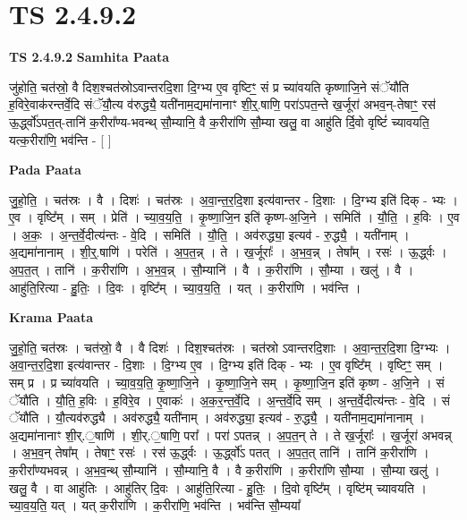 \documentclass[17pt]{extarticle}
\begin{document}
\section{ TS 2.4.9.2 }

\textbf{TS 2.4.9.2 } \newline
\textbf{Samhita Paata} \newline

जु॑होति॒ चत॑स्रो॒ वै दिश॒श्चत॑स्रोऽवान्तरदि॒शा दि॒ग्भ्य ए॒व वृष्टिꣳ॒॒ सं प्र च्या॑वयति कृष्णाजि॒ने संॅयौ॑ति ह॒विरे॒वाक॑रन्तर्वे॒दि संॅयौ॒त्य व॑रुद्ध्यै॒ यती॑नाम॒द्यमा॑नानाꣳ शी॒र्॒.षाणि॒ परा॑ऽपत॒न्ते ख॒र्जूरा॑ अभव॒न्-तेषाꣳ॒॒ रस॑ ऊ॒र्द्ध्वो॑ऽपत॒त्-तानि॑ क॒रीरा᳚ण्य-भवन्थ् सौ॒म्यानि॒ वै क॒रीरा॑णि सौ॒म्या खलु॒ वा आहु॑ति र्दि॒वो वृष्टिं॑ च्यावयति॒ यत्क॒रीरा॑णि॒ भव॑न्ति - [  ] \newline

\textbf{Pada Paata} \newline

जु॒हो॒ति॒ । चत॑स्रः । वै । दिशः॑ । चत॑स्रः । अ॒वा॒न्त॒र॒दि॒शा इत्य॑वान्तर - दि॒शाः । दि॒ग्भ्य इति॑ दिक् - भ्यः । ए॒व । वृष्टि᳚म् । सम् । प्रेति॑ । च्या॒व॒य॒ति॒ । कृ॒ष्णा॒जि॒न इति॑ कृष्ण-अ॒जि॒ने । समिति॑ । यौ॒ति॒ । ह॒विः । ए॒व । अ॒कः॒ । अ॒न्त॒र्वे॒दीत्य॑न्तः - वे॒दि । समिति॑ । यौ॒ति॒ । अव॑रुद्ध्या॒ इत्यव॑ - रु॒द्ध्यै॒ । यती॑नाम् । अ॒द्यमा॑नानाम् । शी॒र्॒.षाणि॑ । परेति॑ । अ॒प॒त॒न्न् । ते । ख॒र्जूराः᳚ । अ॒भ॒व॒न्न् । तेषा᳚म् । रसः॑ । ऊ॒र्द्ध्वः । अ॒प॒त॒त् । तानि॑ । क॒रीरा॑णि । अ॒भ॒व॒न्न् ।  सौ॒म्यानि॑ । वै । क॒रीरा॑णि । सौ॒म्या । खलु॑ । वै । आहु॑ति॒रित्या - हु॒तिः॒ । दि॒वः । वृष्टि᳚म् । च्या॒व॒य॒ति॒ । यत् । क॒रीरा॑णि । भव॑न्ति ।  \newline


\textbf{Krama Paata} \newline

जु॒हो॒ति॒ चत॑स्रः । चत॑स्रो॒ वै । वै दिशः॑ । दिश॒श्चत॑स्रः । चत॑स्रो ऽवान्तरदि॒शाः । अ॒वा॒न्त॒र॒दि॒शा दि॒ग्भ्यः । अ॒वा॒न्त॒र॒दि॒शा इत्य॑वान्तर - दि॒शाः । दि॒ग्भ्य ए॒व । दि॒ग्भ्य इति॑ दिक् - भ्यः । ए॒व वृष्टि᳚म् । वृष्टिꣳ॒॒ सम् । सम् प्र । प्र च्या॑वयति । च्या॒व॒य॒ति॒ कृ॒ष्णा॒जि॒ने । कृ॒ष्णा॒जि॒ने सम् । कृ॒ष्णा॒जि॒न इति॑ कृष्ण - अ॒जि॒ने । सं ॅयौ॑ति । यौ॒ति॒ ह॒विः । ह॒विरे॒व । ए॒वाकः॑ । अ॒क॒र॒न्त॒र्वे॒दि । अ॒न्त॒र्वे॒दि सम् । अ॒न्त॒र्वे॒दीत्य॑न्तः - वे॒दि । सं ॅयौ॑ति । यौ॒त्यव॑रुद्ध्यै । अव॑रुद्ध्यै॒ यती॑नाम् । अव॑रुद्ध्या॒ इत्यव॑ - रु॒द्ध्यै॒ । यती॑नाम॒द्यमा॑नानाम् । अ॒द्यमा॑नानाꣳ शी॒र्.॒षाणि॑ । शी॒र्.॒षाणि॒ परा᳚ । परा॑ ऽपतन्न् । अ॒प॒त॒न् ते । ते ख॒र्जूराः᳚ । ख॒र्जूरा॑ अभवन्न् । अ॒भ॒व॒न् तेषा᳚म् । तेषाꣳ॒॒ रसः॑ । रस॑ ऊ॒र्द्ध्वः । ऊ॒र्द्ध्वो॑ऽ पतत् । अ॒प॒त॒त् तानि॑ । तानि॑ क॒रीरा॑णि । क॒रीरा᳚ण्यभवन्न् । अ॒भ॒व॒न्थ् सौ॒म्यानि॑ । सौ॒म्यानि॒ वै । वै क॒रीरा॑णि । क॒रीरा॑णि सौ॒म्या । सौ॒म्या खलु॑ । खलु॒ वै । वा आहु॑तिः । आहु॑तिर् दि॒वः । आहु॑ति॒रित्या - हु॒तिः॒ । दि॒वो वृष्टि᳚म् । वृष्टि॑म् च्यावयति । च्या॒व॒य॒ति॒ यत् । यत् क॒रीरा॑णि । क॒रीरा॑णि॒ भव॑न्ति । भव॑न्ति सौ॒म्यया᳚ \newline
\end{document}
